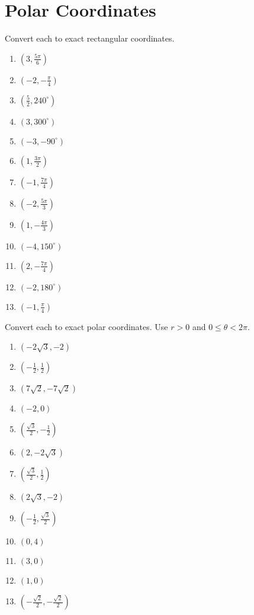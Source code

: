 \chapter{Polar Coordinates}

Convert each to exact rectangular coordinates.
\begin{multicols}{3}
\begin{enumerate}
	\item $\left(3, \frac{5\pi}{6}\right)$
    \item $\left(-2, -\frac{\pi}{4}\right)$
    \item $\left(\frac{5}{2}, 240^\circ\right)$
    \item $\left(3, 300^\circ\right)$
    \item $\left(-3, -90^\circ\right)$
    \item $\left(1, \frac{3\pi}{2}\right)$
    \item $\left(-1, \frac{7\pi}{4}\right)$
    \item $\left(-2, \frac{5\pi}{3}\right)$
    \item $\left(1, -\frac{4\pi}{3}\right)$
    \item $\left(-4, 150^\circ\right)$
    \item $\left(2, -\frac{7\pi}{4}\right)$
    \item $\left(-2, 180^\circ\right)$
    \item $\left(-1, \frac{\pi}{4}\right)$
\end{enumerate}	\setcounter{Review}{\value{enumi}}
\end{multicols}
\smallskip

Convert each to exact polar coordinates. Use $r > 0$ and $0 \leq \theta < 2\pi$.
\begin{multicols}{3}
\begin{enumerate}		\setcounter{enumi}{\value{Review}}
	\item $\left(-2\sqrt{3}, -2\right)$
    \item $\left(-\frac{1}{2}, \frac{1}{2}\right)$
    \item $\left(7\sqrt{2}, -7\sqrt{2}\right)$
    \item $(-2,0)$
    \item $\left(\frac{\sqrt{3}}{2}, -\frac{1}{2}\right)$
    \item $\left(2, -2\sqrt{3}\right)$
    \item $\left(\frac{\sqrt{3}}{2}, \frac{1}{2}\right)$
    \item $\left(2\sqrt{3}, -2\right)$
    \item $\left(-\frac{1}{2}, \frac{\sqrt{3}}{2}\right)$
    \item $(0, 4)$
    \item $(3,0)$
    \item $(1, 0)$
    \item $\left(-\frac{\sqrt{2}}{2}, -\frac{\sqrt{2}}{2}\right)$
\end{enumerate}	\setcounter{Review}{\value{enumi}}
\end{multicols}
\smallskip

